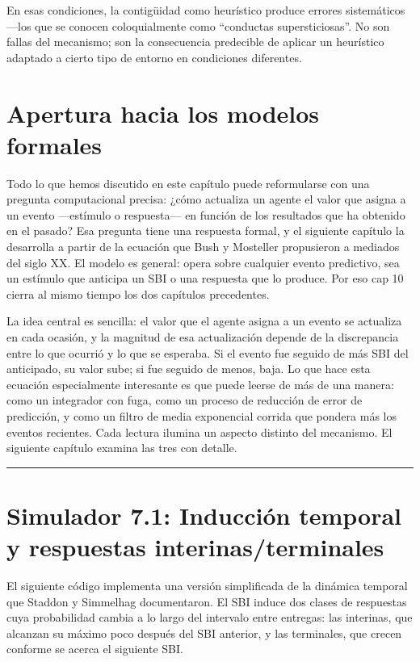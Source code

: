 \documentclass[
  letterpaper,
  DIV=11,
  numbers=noendperiod]{scrreprt}
\begin{document}
\begin{tcolorbox}[enhanced jigsaw, arc=.35mm, bottomrule=.15mm, breakable, colback=white, colframe=quarto-callout-note-color-frame, left=2mm, leftrule=.75mm, opacityback=0, rightrule=.15mm, toprule=.15mm]
En esas condiciones, la contigüidad como heurístico produce errores
sistemáticos ---los que se conocen coloquialmente como ``conductas
supersticiosas''. No son fallas del mecanismo; son la consecuencia
predecible de aplicar un heurístico adaptado a cierto tipo de entorno en
condiciones diferentes.

\section{Apertura hacia los modelos
formales}\label{apertura-hacia-los-modelos-formales}

Todo lo que hemos discutido en este capítulo puede reformularse con una
pregunta computacional precisa: ¿cómo actualiza un agente el valor que
asigna a un evento ---estímulo o respuesta--- en función de los
resultados que ha obtenido en el pasado? Esa pregunta tiene una
respuesta formal, y el siguiente capítulo la desarrolla a partir de la
ecuación que Bush y Mosteller propusieron a mediados del siglo XX. El
modelo es general: opera sobre cualquier evento predictivo, sea un
estímulo que anticipa un SBI o una respuesta que lo produce. Por eso cap
10 cierra al mismo tiempo los dos capítulos precedentes.

La idea central es sencilla: el valor que el agente asigna a un evento
se actualiza en cada ocasión, y la magnitud de esa actualización depende
de la discrepancia entre lo que ocurrió y lo que se esperaba. Si el
evento fue seguido de más SBI del anticipado, su valor sube; si fue
seguido de menos, baja. Lo que hace esta ecuación especialmente
interesante es que puede leerse de más de una manera: como un integrador
con fuga, como un proceso de reducción de error de predicción, y como un
filtro de media exponencial corrida que pondera más los eventos
recientes. Cada lectura ilumina un aspecto distinto del mecanismo. El
siguiente capítulo examina las tres con detalle.

\begin{center}\rule{0.5\linewidth}{0.5pt}\end{center}

\section{Simulador 7.1: Inducción temporal y respuestas
interinas/terminales}\label{simulador-7.1-inducciuxf3n-temporal-y-respuestas-interinasterminales}

El siguiente código implementa una versión simplificada de la dinámica
temporal que Staddon y Simmelhag documentaron. El SBI induce dos clases
de respuestas cuya probabilidad cambia a lo largo del intervalo entre
entregas: las interinas, que alcanzan su máximo poco después del SBI
anterior, y las terminales, que crecen conforme se acerca el siguiente
SBI.


\end{tcolorbox}
\end{document}
